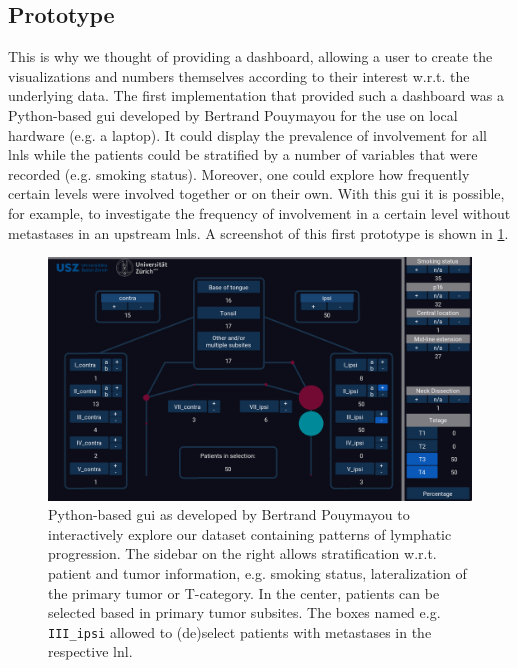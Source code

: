 \documentclass[\relativeRoot/main.tex]{subfiles}
\begin{document}
\subsection*{Prototype}
\label{subsec:lyprox:motivation:prototype}

This is why we thought of providing a dashboard, allowing a user to create the visualizations and numbers themselves according to their interest w.r.t. the underlying data. The first implementation that provided such a dashboard was a Python-based \gls{gui} developed by Bertrand Pouymayou for the use on local hardware (e.g. a laptop). It could display the prevalence of involvement for all \glspl{lnl} while the patients could be stratified by a number of variables that were recorded (e.g. smoking status). Moreover, one could explore how frequently certain levels were involved together or on their own. With this \gls{gui} it is possible, for example, to investigate the frequency of involvement in a certain level without metastases in an upstream \glspl{lnl}. A screenshot of this first prototype is shown in \cref{fig:lyprox:pouymayou_gui}.

\begin{figure}
    \centering
    \includegraphics[width=1.0\textwidth]{figures/pouymayou_gui.png}
    \caption[
        Prototype of a GUI to explore patterns of lymphatic progression
    ]{
        Python-based \gls{gui} as developed by Bertrand Pouymayou to interactively explore our dataset containing patterns of lymphatic progression. The sidebar on the right allows stratification w.r.t. patient and tumor information, e.g. smoking status, lateralization of the primary tumor or T-category. In the center, patients can be selected based in primary tumor subsites. The boxes named e.g. \texttt{III\_ipsi} allowed to (de)select patients with metastases in the respective \gls{lnl}.
    }
    \label{fig:lyprox:pouymayou_gui}
\end{figure}
\end{document}
